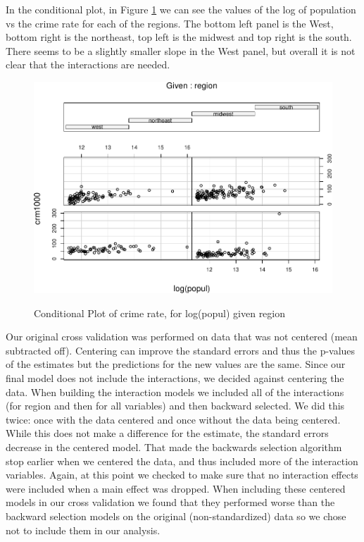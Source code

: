 \documentclass[]{article}
\begin{document}
In the conditional plot, in Figure \ref{fig:coplot} we can see the values of the log of population
vs the crime rate for each of the regions. The bottom left panel is the
West, bottom right is the northeast, top left is the midwest and top
right is the south. There seems to be a slightly smaller slope in the
West panel, but overall it is not clear that the interactions are
needed.

\begin{figure}[h!]
\caption{Conditional Plot of crime rate, for log(popul) given region}
\includegraphics{project_files/figure-latex/unnamed-chunk-7-1.pdf}
\centering
\label{fig:coplot}
\end{figure}


Our original cross validation was performed on data that was not
centered (mean subtracted off). Centering can improve the standard
errors and thus the p-values of the estimates but the predictions for
the new values are the same. Since our final model does not include the
interactions, we decided against centering the data. When building the
interaction models we included all of the interactions (for region and
then for all variables) and then backward selected. We did this twice:
once with the data centered and once without the data being centered.
While this does not make a difference for the estimate, the standard
errors decrease in the centered model. That made the backwards selection
algorithm stop earlier when we centered the data, and thus included more
of the interaction variables. Again, at this point we checked to make
sure that no interaction effects were included when a main effect was
dropped. When including these centered models in our cross validation we
found that they performed worse than the backward selection models on
the original (non-standardized) data so we chose not to include them in
our analysis.
\end{document}
